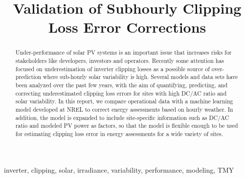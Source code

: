 \documentclass[conference]{IEEEtran}
\begin{document}
\title{Validation of Subhourly Clipping Loss Error Corrections}

\author{
    }

\maketitle

\begin{abstract}
Under-performance of solar PV systems is an important issue that increases risks for stakeholders like developers, investors and operators. Recently some attention has focused on underestimation of inverter clipping losses as a possible source of over-prediction where sub-hourly solar variability is high. Several models and data sets have been analyzed over the past few years, with the aim of quantifying, predicting, and correcting underestimated clipping loss errors for sites with high DC/AC ratio and solar variability. In this report, we compare operational data with a machine learning model developed at NREL to correct energy assessments based on hourly weather. In addition, the model is expanded to include site-specific information such as DC/AC ratio and modeled PV power as factors, so that the model is flexible enough to be used for estimating clipping loss error in energy assessments for a wide variety of sites. 
\end{abstract}

\begin{IEEEkeywords}
inverter, clipping, solar, irradiance, variability, performance, modeling, TMY
\end{IEEEkeywords}
\end{document}
